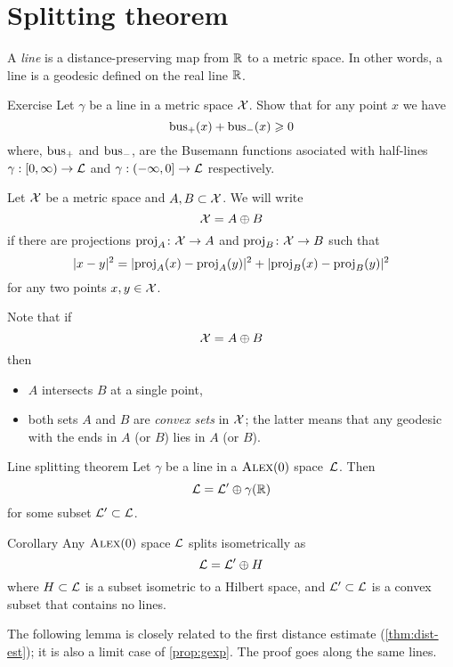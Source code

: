 \section{Splitting theorem}

A \emph{line} is a distance-preserving map
from $\mathbb{R}$ to a metric space.
In other words, a line is a geodesic defined on the real line $\mathbb{R}$.

\begin{thm}{Exercise}\label{ex:bus+bus}
Let $\gamma$ be a line in a metric space $\mathcal{X}$.
Show that for any point $x$ we have
\[\operatorname{\rm bus}\nolimits_+(x)+\operatorname{\rm bus}\nolimits_-(x)\geqslant 0\]
where, $\operatorname{\rm bus}\nolimits_+$ and $\operatorname{\rm bus}\nolimits_-$, are the Busemann functions asociated with half-lines $\gamma:[0,\infty)\to \mathcal{L}$ and $\gamma:(-\infty,0]\to \mathcal{L}$ respectively.
\end{thm}


Let $\mathcal{X}$ be a metric space and $A,B\subset \mathcal{X}$.
We will write 
\[\mathcal{X}=A\oplus B\]
if there are projections $\operatorname{\rm proj}\nolimits_A\colon\mathcal{X}\to A$ 
and 
$\operatorname{\rm proj}\nolimits_B\colon\mathcal{X}\to B$
such that 
\[\dist[2]{x}{y}{}=\dist[2]{\proj_A(x)}{\proj_A(y)}{}+\dist[2]{\proj_B(x)}{\proj_B(y)}{}\]
for any two points $x,y\in \mathcal{X}$.

Note that if 
\[\mathcal{X}=A\oplus B\]
then 
\begin{itemize}
\item $A$ intersects $B$ at a single point,
\item both sets $A$ and $B$ are \emph{convex sets} in $\mathcal{X}$;
the latter means that any geodesic with the ends in $A$ (or $B$) lies in $A$ (or $B$). 
\end{itemize}

\begin{thm}{Line splitting theorem}\label{thm:splitting}
Let $\gamma$ be a line in a $\textsc{Alex}(0)$ space~$\mathcal{L}$. 
Then 
\[\mathcal{L}=\mathcal{L}'\oplus \gamma(\mathbb{R})\]
for some subset $\mathcal{L}'\subset \mathcal{L}$.
\end{thm}

\begin{thm}{Corollary}\label{cor:splitting}
Any $\textsc{Alex}(0)$ space $\mathcal{L}$ splits isometrically as
\[
\mathcal{L}=\mathcal{L}'\oplus H
\]
where $H\subset \mathcal{L}$ is a subset isometric to a Hilbert space, and $\mathcal{L}'\subset \mathcal{L}$ is a convex subset that contains no lines. 
\end{thm}

The following lemma is closely related to the first distance estimate (\ref{thm:dist-est});
it is also a limit case of \ref{prop:gexp}.
The proof goes along the same lines.

